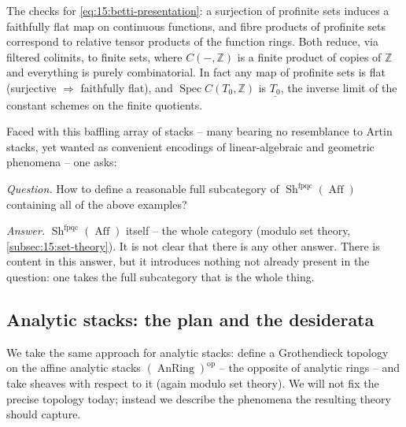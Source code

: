 \begin{remark}
\label{rmk:15:profinite-descent}
The checks for \eqref{eq:15:betti-presentation}: a surjection of profinite sets
induces a faithfully flat map on continuous functions, and fibre products of
profinite sets correspond to relative tensor products of the function rings. Both
reduce, via filtered colimits, to finite sets, where $C(-,\mathbb{Z})$ is a finite
product of copies of $\mathbb{Z}$ and everything is purely combinatorial. In fact any
map of profinite sets is flat (surjective $\Rightarrow$ faithfully flat), and
$\operatorname{Spec} C(T_0,\mathbb{Z})$ is $\underline{T_0}$, the inverse limit of the
constant schemes on the finite quotients.
\end{remark}

Faced with this baffling array of stacks -- many bearing no resemblance to Artin
stacks, yet wanted as convenient encodings of linear-algebraic and geometric
phenomena -- one asks:

\begin{remark}
\label{rmk:15:answer}
\emph{Question.} How to define a reasonable full subcategory of
$\operatorname{Sh}^{\mathrm{fpqc}}(\operatorname{Aff})$ containing all of the above
examples?

\emph{Answer.} $\operatorname{Sh}^{\mathrm{fpqc}}(\operatorname{Aff})$ itself -- the
whole category (modulo set theory, \cref{subsec:15:set-theory}). It is not clear that
there is any other answer. There is content in this answer, but it introduces
nothing not already present in the question: one takes the full subcategory that is
the whole thing.
\end{remark}

\subsection{Analytic stacks: the plan and the desiderata}

\begin{remark}
\label{rmk:15:plan}
We take the same approach for analytic stacks: define a Grothendieck topology on the
affine analytic stacks $(\operatorname{AnRing})^{\mathrm{op}}$ -- the opposite of
analytic rings -- and take sheaves with respect to it (again modulo set theory). We
will not fix the precise topology today; instead we describe the phenomena the
resulting theory should capture.
\end{remark}

